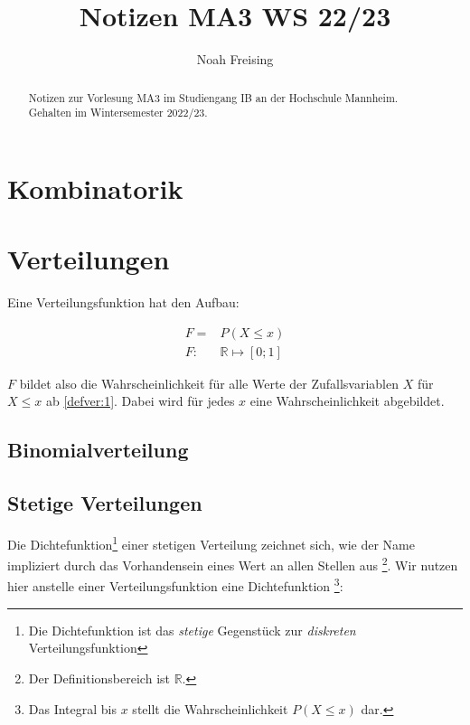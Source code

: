 \documentclass{tufte-handout}
\title{Notizen MA3 WS 22/23}
\author[Noah Freising]{Noah Freising}
\theoremstyle{own}
\begin{document}
\maketitle%

\begin{abstract}
\noindent
Notizen zur Vorlesung MA3 im Studiengang IB an der Hochschule Mannheim. Gehalten im Wintersemester 2022/23.
\end{abstract}

{\small\tableofcontents}


\section{Kombinatorik}

\section{Verteilungen}

Eine Verteilungsfunktion hat den Aufbau:

\begin{align}
F = & P(X \leq x) \label{defver:1} \\ 
F  :&  \mathbb{R} \mapsto [0;1] \label{defver:2}
\end{align}

$F$ bildet also die Wahrscheinlichkeit für alle Werte der Zufallsvariablen $X$ für $X \leq x$ ab \eqref{defver:1}. Dabei wird für jedes $x$ eine Wahrscheinlichkeit abgebildet.

\subsection{Binomialverteilung}

\subsection{Stetige Verteilungen}

Die Dichtefunktion\footnote{Die Dichtefunktion ist das \textit{stetige} Gegenstück zur \textit{diskreten} Verteilungsfunktion}
einer stetigen Verteilung zeichnet sich, wie der Name impliziert durch das Vorhandensein eines Wert an allen Stellen aus
\footnote{Der Definitionsbereich ist $\mathbb{R}$.}. 
Wir nutzen hier anstelle einer Verteilungsfunktion eine Dichtefunktion
\footnote{Das Integral bis $x$ stellt die Wahrscheinlichkeit $P(X \leq x)$ dar.}:
\end{document}
